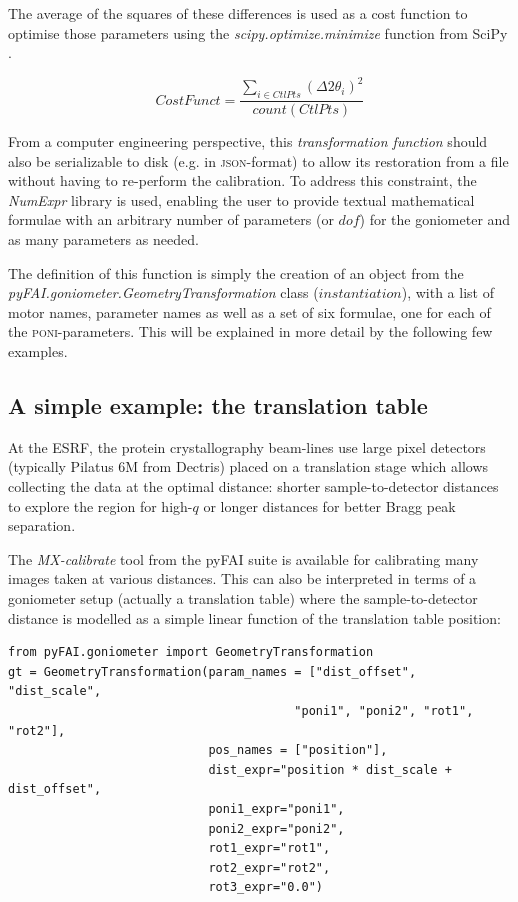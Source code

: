 \documentclass[preprint]{iucr}              %
\begin{document}
The average of the squares of these differences is used as a cost function
to optimise those parameters using the \textit{scipy.optimize.minimize}
function from SciPy \cite{scipy}.

$$
CostFunct = \frac{ \sum\limits_{i \in CtlPts} {(\Delta 2\theta_i)^2}}
{count(CtlPts)} $$

From a computer engineering perspective, this \textit{transformation function}
should also be serializable to disk (e.g. in \textsc{json}-format) to allow
its restoration from a file without having to re-perform the calibration. 
To address this constraint, the \textit{NumExpr} library \cite{numexpr} is
used, enabling the user to provide textual mathematical formulae with
an arbitrary number of parameters (or $dof$) for the goniometer and as many parameters
as needed.

The definition of this function is simply the creation of an object from the 
\textit{pyFAI.goniometer.GeometryTransformation} class ($instantiation$), with a list of
motor names, parameter names as well as a set of six formulae, one for each of
the \textsc{poni}-parameters.
This will be explained in more detail by the following few examples.

\subsection{A simple example: the translation table}

At the  ESRF, the protein crystallography beam-lines use large pixel detectors
(typically Pilatus 6M from Dectris) placed on a translation stage which allows
collecting the data at the optimal distance: shorter sample-to-detector
distances to explore the region for high-$q$ 
or longer distances for better Bragg peak separation. 

The \textit{MX-calibrate} tool from the pyFAI suite is available for
calibrating many images taken at various distances.
This can also be interpreted in terms of a goniometer setup (actually a translation table) where the sample-to-detector distance is modelled as a
simple linear function of the translation table position:

\begin{verbatim}
from pyFAI.goniometer import GeometryTransformation
gt = GeometryTransformation(param_names = ["dist_offset", "dist_scale", 
                                        "poni1", "poni2", "rot1", "rot2"],
                            pos_names = ["position"],
                            dist_expr="position * dist_scale + dist_offset", 
                            poni1_expr="poni1",
                            poni2_expr="poni2", 
                            rot1_expr="rot1", 
                            rot2_expr="rot2", 
                            rot3_expr="0.0")
\end{verbatim}
 
\end{document}
